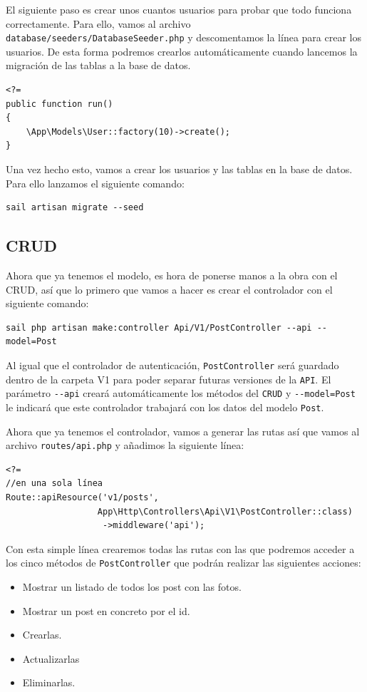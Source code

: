 \documentclass[11pt]{article}
\begin{document}
El siguiente paso es crear unos cuantos usuarios para probar que todo
funciona correctamente. Para ello, vamos al archivo
\texttt{database/seeders/DatabaseSeeder.php} y descomentamos la línea para
crear los usuarios. De esta forma podremos crearlos automáticamente
cuando lancemos la migración de las tablas a la base de datos.
\begin{verbatim}
<?=
public function run()
{
    \App\Models\User::factory(10)->create();
}
\end{verbatim}

Una vez hecho esto, vamos a crear los usuarios y las tablas en la base
de datos. Para ello lanzamos el siguiente comando:
\begin{verbatim}
sail artisan migrate --seed
\end{verbatim}

\subsection{CRUD}
\label{sec:org2237f21}
Ahora que ya tenemos el modelo, es hora de ponerse manos a la obra con
el CRUD, así que lo primero que vamos a hacer es crear el controlador
con el siguiente comando:
\begin{verbatim}
sail php artisan make:controller Api/V1/PostController --api --model=Post
\end{verbatim}

Al igual que el controlador de autenticación, \texttt{PostController} será
guardado dentro de la carpeta V1 para poder separar futuras versiones
de la \texttt{API}. El parámetro \texttt{-{}-{}api} creará automáticamente los métodos del
\texttt{CRUD} y \texttt{-{}-{}model=Post} le indicará que este controlador trabajará con los
datos del modelo \texttt{Post}.

Ahora que ya tenemos el controlador, vamos a generar las rutas así que
vamos al archivo \texttt{routes/api.php} y añadimos la siguiente línea:

\begin{verbatim}
<?=
//en una sola línea
Route::apiResource('v1/posts',
                  App\Http\Controllers\Api\V1\PostController::class)
                   ->middleware('api');
\end{verbatim}

Con esta simple línea crearemos todas las rutas con las que podremos
acceder a los cinco métodos de \texttt{PostController} que podrán realizar las
siguientes acciones:

\begin{itemize}
\item Mostrar un listado de todos los post con las fotos.
\item Mostrar un post en concreto por el id.
\item Crearlas.
\item Actualizarlas
\item Eliminarlas.
\end{itemize}
\end{document}
